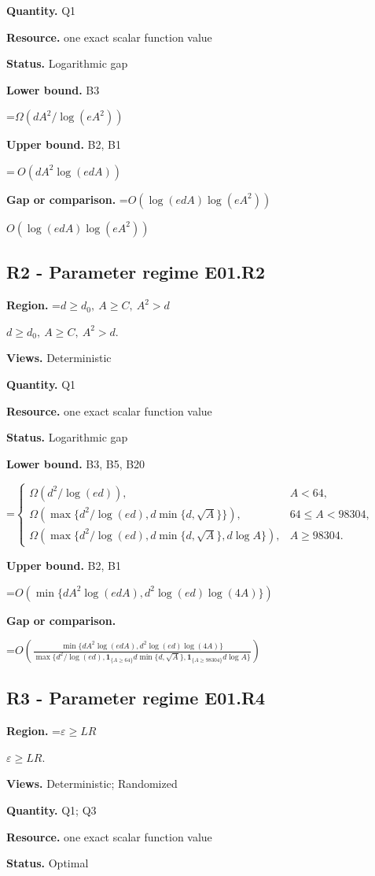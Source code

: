 \documentclass[10pt,a4paper]{article}
\newcommand{\AtlasMath}[1]{\par\begingroup\centering\setbox0=\hbox{$\displaystyle #1$}\ifdim\wd0>1.4\linewidth\typeout{ATLAS WIDE FORMULA: \the\wd0}\fi\ifdim\wd0>\linewidth\resizebox{\linewidth}{!}{\box0}\else\box0\fi\par\endgroup}
\newcommand{\AtlasInlineMath}[1]{\begingroup\setbox0=\hbox{$#1$}\ifdim\wd0>.4\linewidth\endgroup\AtlasMath{#1}\else\endgroup$#1$\fi}
\begin{document}
\textbf{Quantity.} Q1

\textbf{Resource.} one exact scalar function value

\textbf{Status.} Logarithmic gap

\textbf{Lower bound.} B3

\AtlasMath{\Omega(dA^2/\log(eA^2))}
\textbf{Upper bound.} B2, B1

\AtlasMath{\ O(dA^2\log(edA))}
\textbf{Gap or comparison.} \AtlasInlineMath{O(\log(edA)\log(eA^2))}

\subsection{R2 - Parameter regime E01.R2}
\textbf{Region.} \AtlasInlineMath{d\ge d_0,\ A\ge C,\ A^2>d}.

\textbf{Views.} Deterministic

\textbf{Quantity.} Q1

\textbf{Resource.} one exact scalar function value

\textbf{Status.} Logarithmic gap

\textbf{Lower bound.} B3, B5, B20

\AtlasMath{\begin{cases}\Omega(d^2/\log(ed)),&A<64,\\\Omega(\max\{d^2/\log(ed),d\min\{d,\sqrt A\}\}),&64\le A<98304,\\\Omega(\max\{d^2/\log(ed),d\min\{d,\sqrt A\},d\log A\}),&A\ge98304.\end{cases}}
\textbf{Upper bound.} B2, B1

\AtlasMath{O(\min\{dA^2\log(edA),d^2\log(ed)\log(4A)\})}
\textbf{Gap or comparison.} 
\AtlasMath{O\!\left(\frac{\min\{dA^2\log(edA),d^2\log(ed)\log(4A)\}}{\max\{d^2/\log(ed),\mathbf{1}_{\{A\ge64\}}d\min\{d,\sqrt A\},\mathbf{1}_{\{A\ge98304\}}d\log A\}}\right)}


\subsection{R3 - Parameter regime E01.R4}
\textbf{Region.} \AtlasInlineMath{\varepsilon\ge LR}.

\textbf{Views.} Deterministic; Randomized

\textbf{Quantity.} Q1; Q3

\textbf{Resource.} one exact scalar function value

\textbf{Status.} Optimal
\end{document}
